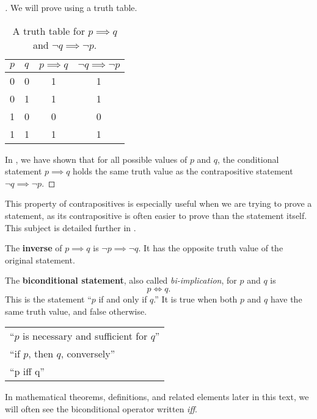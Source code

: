 \begin{proof}[]
  We will prove  using a truth table.
  \begin{table}[H]
    \centering
    \begin{tabular}{llcc}
      \toprule
      $p$ & $q$ & $p\implies q$ & $\neg q \implies \neg p$\\
      \midrule
      0 & 0 & 1 & 1 \\
      0 & 1 & 1 & 1 \\
      1 & 0 & 0 & 0 \\
      1 & 1 & 1 & 1 \\
      \bottomrule
    \end{tabular}
    \caption{A truth table for $p\implies q$ and $\neg q \implies \neg p$.}
    \label{tab:contrapositive}
  \end{table}
  In , we have shown that for all
  possible values of $p$ and $q$,
  the conditional statement $p \implies q$
  holds the same truth value as the contrapositive statement
  $\neg q \implies \neg p$.
\end{proof}

This property of contrapositives is especially useful when we are trying to prove a statement,
as its contrapositive is often easier to prove than the statement itself.
This subject is detailed further in .

  The \textbf{inverse} of \(p \implies q\) is \(\neg p \implies \neg q\).
  It has the opposite truth value of the original statement.

  The \textbf{biconditional statement}, also called \emph{bi-implication}, for $p$ and $q$ is \[p \iff q.\] This is the statement
  ``\(p\) if and only if \(q\).''
  It is true when both \(p\) and \(q\) have the same truth value, and false otherwise.
\begin{table}[h]
  \centering
    \begin{tabular}{l}
      ``\(p\) is necessary and sufficient for \(q\)'' \\
      ``if \(p\), then \(q\), conversely'' \\
      ``p iff q''
    \end{tabular}
  \label{tab:biconditionals}
\end{table}
In mathematical theorems, definitions, and related elements later in this text, we will often see the biconditional operator written \emph{iff}.

